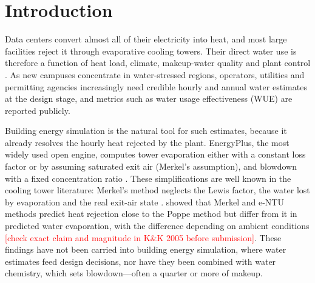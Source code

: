 \documentclass[preprint,12pt,authoryear]{elsarticle}
\newcommand{\tbd}[1]{\textcolor{red}{[#1]}}
\begin{document}
\section{Introduction}
Data centers convert almost all of their electricity into heat, and most large facilities reject it through
evaporative cooling towers. Their direct water use is therefore a function of heat load, climate, makeup-water
quality and plant control \citep{mytton2021data,shehabi2016united}. As new campuses concentrate in water-stressed
regions, operators, utilities and permitting agencies increasingly need credible hourly and annual water estimates at
the design stage, and metrics such as water usage effectiveness (WUE) \citep{greengrid2011wue} are reported publicly.

Building energy simulation is the natural tool for such estimates, because it already resolves the hourly heat
rejected by the plant. EnergyPlus, the most widely used open engine, computes tower evaporation either with a constant
loss factor or by assuming saturated exit air (Merkel's assumption), and blowdown with a fixed concentration ratio
\citep{doe2022engref}. These simplifications are well known in the cooling tower literature: Merkel's method
neglects the Lewis factor, the water lost by evaporation and the real exit-air state \citep{merkel1925verdunstungskuhlung,kloppers2005critical}.
\citet{kloppers2005critical,kloppers2005cooling} showed that Merkel and e-NTU methods predict heat rejection
close to the Poppe method \citep{poppe1991berechnung} but differ from it in predicted water evaporation, with the difference
depending on ambient conditions \tbd{check exact claim and magnitude in K\&K 2005 before submission}. These findings have not been carried into building energy simulation, where water estimates feed design
decisions, nor have they been combined with water chemistry, which sets blowdown---often a quarter or more of makeup.
\end{document}
